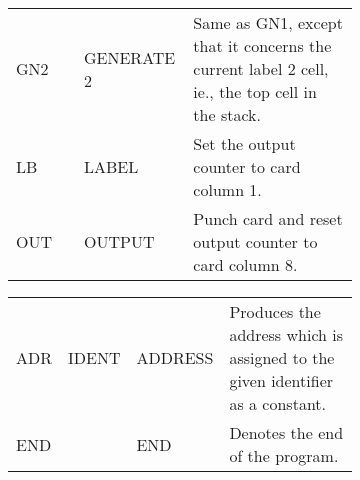 \documentclass[notitlepage,twocolumn]{report}
\begin{document}
\begin{figure}[htb]
\begin{subfigure}[b]{\textwidth}
\begin{tabular}{lllp{7cm}}
      GN2 & & GENERATE 2 & Same as GN1, except that it concerns the
                           current label 2 cell, ie., the top cell in the
                           stack. \\
      LB & & LABEL & Set the output counter to card column 1. \\
      OUT & & OUTPUT & Punch card and reset output counter to card column
                       8. \\
    \end{tabular}
  \end{subfigure}
  \begin{subfigure}[b]{\textwidth}
    \begin{tabular}{lllp{7cm}}
      ADR & IDENT & ADDRESS & Produces the address which is assigned to
                              the given identifier as a constant. \\
      END & & END & Denotes the end of the program. \\
    \end{tabular}
  \end{subfigure}
\end{figure}


\end{document}
